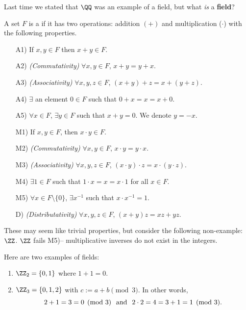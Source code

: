 \begin{question}
Last time we stated that $\QQ$ was an example of a field, but what \textit{is} a \textbf{field}?
\end{question}
\begin{definition}[Field]
A set $F$ is a  if it has two operations: addition $(+)$ and multiplication ($\cdot$) with the following properties.
\begin{enumerate}
    \item[A1)] If $x,y\in F$ then $x+y \in F$.
    \item[A2)] \textit{(Commutativity)} $\forall x,y\in F$, $x+y= y+x$.
    \item[A3)] \textit{(Associativity)} $\forall x,y,z\in F$, $(x+y)+z = x+(y+z)$.
    \item[A4)] $\exists$ an element $0\in F$ such that $0+x = x = x+0$.
    \item[A5)] $\forall x\in F$, $\exists y\in F$ such that $x+y=0$. We denote $y=-x$.
    \item[M1)] If $x,y\in F$, then $x\cdot y\in F$.
    \item[M2)] \textit{(Commutativity)} $\forall x,y\in F$, $x\cdot y= y\cdot x$.
    \item[M3)] \textit{(Associativity)} $\forall x,y,z\in F$, $(x\cdot y)\cdot z= x\cdot (y\cdot z)$.
    \item[M4)] $\exists 1\in F$ such that $1\cdot x = x = x\cdot 1$ for all $x\in F$.
    \item[M5)] $\forall x\in F\setminus\{0\}$, $\exists x^{-1}$ such that $x\cdot x^{-1} = 1.$
    \item[D)] \textit{(Distributativity)} $\forall x,y,z\in F$, $(x+y)z = xz+yz.$
\end{enumerate}
\end{definition}
These may seem like trivial properties, but consider the following non-example: $\ZZ$. $\ZZ$ fails M5)-- multiplicative inverses do not exist in the integers.

\begin{example}
Here are two examples of fields:
\begin{enumerate}
    \item $\ZZ_2 = \{0,1\}$ where $1+1 = 0$.
    \item $\ZZ_3 = \{0,1,2\}$ with $c:= a+b \pmod{3}$. In other words, \[2+1=3=0\pmod 3 \hspace{.25cm} \text{and} \hspace{.25cm} 2\cdot2 = 4 = 3+1 = 1\pmod 3.\]
\end{enumerate}
\end{example}

